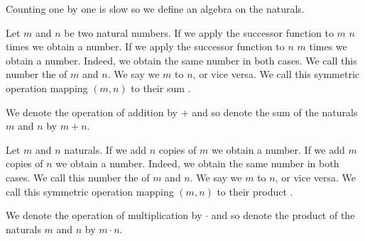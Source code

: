 
\sbasic




\sstart
{}


Counting one by one is slow so we define an algebra on the naturals.


Let $m$ and $n$ be two natural numbers.
If we apply the successor function to $m$ $n$ times we obtain a number.
If we apply the successor function to $n$ $m$ times we obtain a number.
Indeed, we obtain the same number in both cases.
We call this number the  of $m$ and $n$.
We say we  $m$ to $n$, or vice versa.
We call this symmetric operation mapping $(m, n)$ to their sum .


We denote the operation of addition by $+$ and so denote the sum of the naturals $m$ and $n$ by $m + n$.


Let $m$ and $n$ naturals.
If we add $n$ copies of $m$ we obtain a number.
If we add $m$ copies of $n$ we obtain a number.
Indeed, we obtain the same number in both cases.
We call this number the  of $m$ and $n$.
We say we  $m$ to $n$, or vice versa.
We call this symmetric operation mapping $(m, n)$ to their product .


We denote the operation of multiplication by $\cdot$ and so denote the product of the naturals $m$ and $n$ by $m \cdot n$.

\strats

